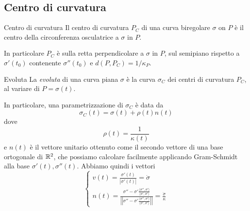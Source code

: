 \documentclass[a4paper]{article}
\begin{document}
\subsection{Centro di curvatura}

\begin{snippetdefinition}{Centro di curvatura}
    Il centro di curvatura \(P_C\) di una curva biregolare \(\sigma\)
    on \(P\) è il centro della circonferenza osculatrice a \(\sigma\)
    in \(P\).
\end{snippetdefinition}

\begin{center}
\end{center}

In particolare \(P_C\) è sulla retta perpendicolare a \(\sigma\) in \(P\),
sul semipiano rispetto a \(\sigma'(t_0)\) contenente \(\sigma''(t_0)\)
e \(d(P, P_C) = 1/\kappa_P\).

\begin{snippetdefinition}{Evoluta}
    La \emph{evoluta} di una curva piana \(\sigma\)
    è la curva \(\sigma_C\) dei centri di curvatura
    \(P_C\), al variare di \(P=\sigma(t)\).
\end{snippetdefinition}

In particolare, una parametrizzazione di \(\sigma_C\) è data da
\[
    \sigma_C(t) = \sigma(t) + \rho(t)n(t)
\]
dove
\[
    \rho(t) = \frac{1}{\kappa(t)}
\]
e \(n(t)\) è il vettore unitario ottenuto come il secondo vettore
di una base ortogonale di \(\mathbb{R}^2\),
che possiamo calcolare facilmente applicando Gram-Schmidt alla base
\(\sigma'(t), \sigma''(t)\). Abbiamo quindi i vettori
\[
    \begin{cases}
        v(t) = \frac{\sigma'(t)}{|\sigma'(t)|} = \dot\sigma \\
        n(t) = \frac{
            \sigma'' - \sigma'\frac{\langle \sigma'', \sigma'\rangle}{\langle \sigma', \sigma'\rangle}
        }{
            \left|\left|
                \sigma'' - \sigma'\frac{\langle \sigma'', \sigma'\rangle}{\langle \sigma', \sigma'\rangle}
            \right|\right|
        } = \frac{\ddot\sigma}{\kappa}
   \end{cases}
\]
\end{document}
